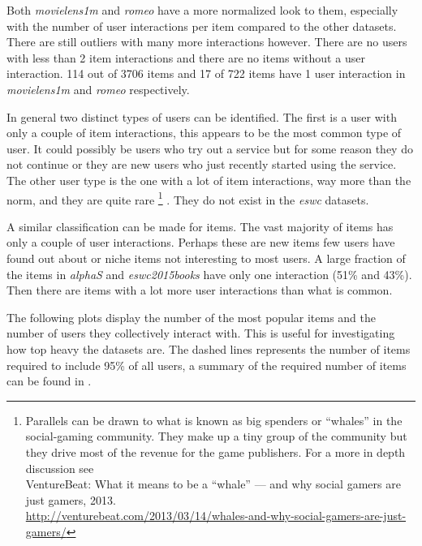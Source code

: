 


Both \textit{movielens1m} and \textit{romeo} have a more normalized look to them, especially with the number of user interactions per item compared to the other datasets. There are still outliers with many more interactions however. There are no users with less than 2 item interactions and there are no items without a user interaction. 114 out of 3706 items and 17 of 722 items have 1 user interaction in \textit{movielens1m} and \textit{romeo} respectively.

\FloatBarrier

In general two distinct types of users can be identified. The first is a user with only a couple of item interactions, this appears to be the most common type of user. It could possibly be users who try out a service but for some reason they do not continue or they are new users who just recently started using the service. The other user type is the one with a lot of item interactions, way more than the norm, and they are quite rare
\footnote{Parallels can be drawn to what is known as big spenders or ``whales'' in the social-gaming community. They make up a tiny group of the community but they drive most of the revenue for the game publishers. For a more in depth discussion see \\
VentureBeat: What it means to be a ``whale'' — and why social gamers are just gamers, 2013. \\
\url{http://venturebeat.com/2013/03/14/whales-and-why-social-gamers-are-just-gamers/} }
. They do not exist in the \textit{eswc} datasets.

A similar classification can be made for items. The vast majority of items has only a couple of user interactions. Perhaps these are new items few users have found out about or niche items not interesting to most users.
A large fraction of the items in \textit{alphaS} and \textit{eswc2015books} have only one interaction (51\% and 43\%).  Then there are items with a lot more user interactions than what is common.

The following plots display the number of the most popular items and the number of users they collectively interact with. This is useful for investigating how top heavy the datasets are. The dashed lines represents the number of items required to include 95\% of all users, a summary of the required number of items can be found in .

